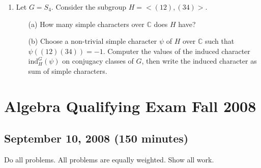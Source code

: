 \documentclass{article}
\begin{document}
\begin{enumerate}
    \item Let \(G = S_4\). Consider the subgroup \(H = < (12), (34) >\).
    \begin{itemize}
        \item[(a)] How many simple characters over \(\mathbb{C}\) does \(H\) have?
        \item[(b)] Choose a non-trivial simple character \(\psi\) of \(H\) over \(\mathbb{C}\) such that \(\psi((12)(34)) = -1\). Computer the values of the induced character \(\text{ind}_H^G(\psi)\) on conjugacy classes of \(G\), then write the induced character as sum of simple characters.
    \end{itemize}
\end{enumerate}

\section*{Algebra Qualifying Exam Fall 2008}
\subsection*{September 10, 2008 (150 minutes)}

Do all problems. All problems are equally weighted. Show all work.
\end{document}
